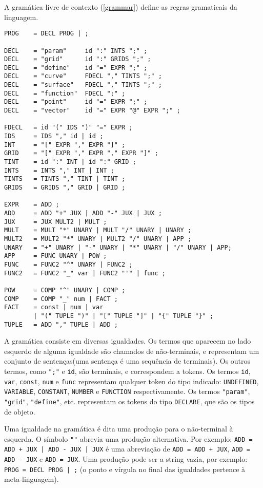 \newpage
A gramática livre de contexto (\ref{grammar}) define as
regras gramaticais da linguagem.
\begin{lstlisting}[caption=Gramática livre de contexto, label=grammar]
PROG    = DECL PROG | ;

DECL    = "param"     id ":" INTS ";" ;
DECL    = "grid"      id ":" GRIDS ";" ;
DECL    = "define"    id "=" EXPR ";" ;
DECL    = "curve"     FDECL "," TINTS ";" ;
DECL    = "surface"   FDECL "," TINTS ";" ;
DECL    = "function"  FDECL ";" ;
DECL    = "point"     id "=" EXPR ";" ;
DECL    = "vector"    id "=" EXPR "@" EXPR ";" ;

FDECL   = id "(" IDS ")" "=" EXPR ;
IDS     = IDS "," id | id ;
INT     = "[" EXPR "," EXPR "]" ;
GRID    = "[" EXPR "," EXPR "," EXPR "]" ;
TINT    = id ":" INT | id ":" GRID ;
INTS    = INTS "," INT | INT ;
TINTS   = TINTS "," TINT | TINT ;
GRIDS   = GRIDS "," GRID | GRID ;

EXPR    = ADD ;
ADD     = ADD "+" JUX | ADD "-" JUX | JUX ;
JUX     = JUX MULT2 | MULT ;
MULT    = MULT "*" UNARY | MULT "/" UNARY | UNARY ;
MULT2   = MULT2 "*" UNARY | MULT2 "/" UNARY | APP ;
UNARY   = "+" UNARY | "-" UNARY | "*" UNARY | "/" UNARY | APP;
APP     = FUNC UNARY | POW ;
FUNC    = FUNC2 "^" UNARY | FUNC2 ;
FUNC2   = FUNC2 "_" var | FUNC2 "'" | func ;

POW     = COMP "^" UNARY | COMP ;
COMP    = COMP "_" num | FACT ;
FACT    = const | num | var
        | "(" TUPLE ")" | "[" TUPLE "]" | "{" TUPLE "}" ;
TUPLE   = ADD "," TUPLE | ADD ;
\end{lstlisting}

A gramática consiste em diversas igualdades.
Os termos que aparecem no lado esquerdo de alguma igualdade
são chamados de não-terminais,
e representam um conjunto de sentenças(uma sentença é uma sequência de terminais).
Os outros termos, como \texttt{";"} e \texttt{id}, são terminais,
e correspondem a tokens. Os termos \texttt{id}, \texttt{var},
\texttt{const}, \texttt{num}
e \texttt{func} representam qualquer token do tipo indicado:
\texttt{UNDEFINED}, \texttt{VARIABLE}, \texttt{CONSTANT},
\texttt{NUMBER} e \texttt{FUNCTION} respectivamente.
Os termos \texttt{"param"}, \texttt{"grid"}, \texttt{"define"}, etc.
representam os tokens do tipo \texttt{DECLARE}, que são os tipos de objeto.

Uma igualdade na gramática é dita uma produção para o não-terminal à esquerda.
O símbolo \texttt{"\textbar"}  abrevia uma produção alternativa. 
Por exemplo: \texttt{ADD = ADD + JUX | ADD - JUX | JUX}
é uma abreviação de \texttt{ADD = ADD + JUX},
\texttt{ADD = ADD - JUX} e \texttt{ADD = JUX}.
Uma produção pode ser a string vazia, por exemplo: \texttt{PROG = DECL PROG | ;}
(o ponto e vírgula no final das igualdades pertence à meta-linguagem).

